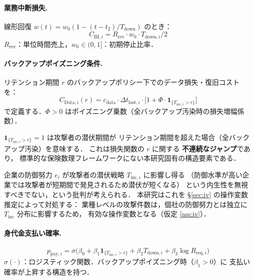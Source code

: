 \documentclass{ipsjlike}
\newcommand{\ind}{\mathbf{1}}
\begin{document}
\paragraph{業務中断損失.}
線形回復 $w(t) = w_0(1-(t-t_2)/T_{\mathrm{down}})$ のとき：
\begin{equation}
  C_{\mathrm{BI},i} = R_{\mathrm{rev}} \cdot w_0 \cdot T_{\mathrm{down},i} / 2
  \label{eq:cbi}
\end{equation}
$R_{\mathrm{rev}}$：単位時間売上，$w_0 \in (0,1]$：初期停止比率．

\paragraph{バックアップポイズニング条件.}

\begin{definition}[バックアップポイズニング乗数]\label{def:phi}
  リテンション期間 $r$ のバックアップポリシー下でのデータ損失・復旧コストを：
  \begin{equation}
    C_{\mathrm{Data},i}(r) = c_{\mathrm{data}} \cdot \Delta t_{\mathrm{lost},i}
      \cdot \bigl[1 + \Phi \cdot \ind_{\{T_{\mathrm{inc},i} > r\}}\bigr]
    \label{eq:cdata}
  \end{equation}
  で定義する．$\Phi > 0$ はポイズニング乗数（全バックアップ汚染時の損失増幅係数）．
\end{definition}

$\ind_{\{T_{\mathrm{inc},i} > r\}} = 1$ は攻撃者の潜伏期間が
リテンション期間を超えた場合（全バックアップ汚染）を意味する．
これは損失関数の $r$ に関する \textbf{不連続なジャンプ}であり，
標準的な保険数理フレームワークにない本研究固有の構造要素である．

\begin{remark}[内生性への対処]\label{rem:endogeneity}
  企業の防御努力 $e_i$ が攻撃者の潜伏戦略 $T_{\mathrm{inc},i}$ に影響し得る
  （防御水準が高い企業では攻撃者が短期間で発見されるため潜伏が短くなる）
  という内生性を無視すべきでない，という批判が考えられる．
  本研究はこれを §\ref{sec:iv} の操作変数推定によって対処する：
  業種レベルの攻撃件数は，個社の防御努力とは独立に $T_{\mathrm{inc}}$ 分布に影響するため，
  有効な操作変数となる（仮定 \ref{ass:iv}）．
\end{remark}

\paragraph{身代金支払い確率.}
\begin{equation}
  p_{\mathrm{pay},i} = \sigma\!\bigl(\beta_0 + \beta_1 \ind_{\{T_{\mathrm{inc},i} > r\}}
    + \beta_2 T_{\mathrm{down},i} + \beta_3 \log R_{\mathrm{req},i}\bigr)
  \label{eq:ppay}
\end{equation}
$\sigma(\cdot)$：ロジスティック関数．バックアップポイズニング時（$\beta_1 > 0$）に
支払い確率が上昇する構造を持つ．
\end{document}
